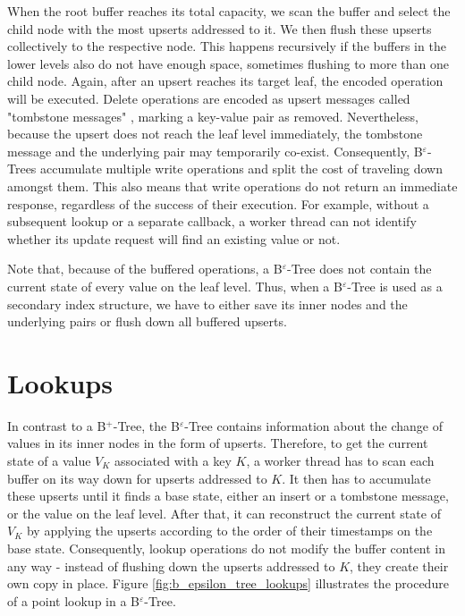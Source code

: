 When the root buffer reaches its total capacity, we scan the buffer and select the child node with the most upserts addressed to it. We then flush these upserts collectively to the respective node. This happens recursively if the buffers in the lower levels also do not have enough space, sometimes flushing to more than one child node. Again, after an upsert reaches its target leaf, the encoded operation will be executed. Delete operations are encoded as upsert messages called "tombstone messages" \cite{b_epsilon_tree}, marking a key-value pair as removed. Nevertheless, because the upsert does not reach the leaf level immediately, the tombstone message and the underlying pair may temporarily co-exist.\newline
Consequently, B$^\varepsilon$-Trees accumulate multiple write operations and split the cost of traveling down amongst them. This also means that write operations do not return an immediate response, regardless of the success of their execution. For example, without a subsequent lookup or a separate callback, a worker thread can not identify whether its update request will find an existing value or not.

Note that, because of the buffered operations, a B$^\varepsilon$-Tree does not contain the current state of every value on the leaf level. Thus, when a B$^\varepsilon$-Tree is used as a secondary index structure, we have to either save its inner nodes and the underlying pairs or flush down all buffered upserts.

\section{Lookups}
In contrast to a B$^+$-Tree, the B$^\varepsilon$-Tree contains information about the change of values in its inner nodes in the form of upserts. Therefore, to get the current state of a value $V_K$ associated with a key $K$, a worker thread has to scan each buffer on its way down for upserts addressed to $K$. It then has to accumulate these upserts until it finds a base state, either an insert or a tombstone message, or the value on the leaf level. After that, it can reconstruct the current state of $V_K$ by applying the upserts according to the order of their timestamps on the base state. Consequently, lookup operations do not modify the buffer content in any way - instead of flushing down the upserts addressed to $K$, they create their own copy in place. Figure \ref{fig:b_epsilon_tree_lookups} illustrates the procedure of a point lookup in a B$^\varepsilon$-Tree.


